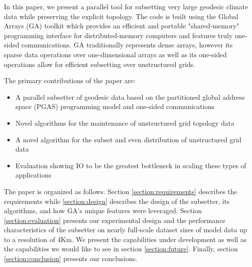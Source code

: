 In this paper, we present a parallel tool for subsetting very large geodesic
climate data while preserving the explicit topology.  The code is built using
the Global Arrays (GA) toolkit\cite{GA} which provides an efficient and
portable "shared-memory" programming interface for distributed-memory
computers and features truly one-sided communications.  GA traditionally
represents dense arrays, however its sparse data operations over
one-dimensional arrays as well as its one-sided operations allow for efficient
subsetting over unstructured grids.

The primary contributions of the paper are:
\begin{itemize}
\item A parallel subsetter of geodesic data based on the partitioned global
address space (PGAS) programming model and one-sided communications
\item Novel algorithms for the maintenance of unstructured grid topology data
\item A novel algorithm for the subset and even distribution of unstructured grid data
\item Evaluation showing IO to be the greatest bottleneck in scaling these types of applications
\end{itemize}

The paper is organized as follows.  Section \ref{section:requirements}
describes the requirements while \ref{section:design} describes the design of
the subsetter, its algorithms, and how GA's unique features were leveraged.
Section \ref{section:evaluation} presents our experimental design and the
performance characteristics of the subsetter on nearly full-scale dataset
sizes of model data up to a resolution of 4Km.  We present the capabilities
under development as well as the capabilities we would like to see in section
\ref{section:future}.  Finally, section \ref{section:conclusion} presents our
conclusions.
